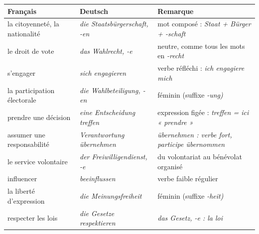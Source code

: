 \documentclass[11pt]{article}
\newcommand{\all}[1]{\ifmmode\text{\textit{#1}}\else\begingroup\selectlanguage{ngerman}\itshape #1\endgroup\fi}
\begin{document}
\begin{center}
\begin{tabularx}{\linewidth}{|X|X|X|}
\hline
\rowcolor{popblueL} \textbf{Français} & \textbf{Deutsch} & \textbf{Remarque} \\
\hline
la citoyenneté, la nationalité & \all{die Staatsbürgerschaft, -en} & mot composé : \all{Staat} + \all{Bürger} + \all{-schaft} \\
\hline
le droit de vote & \all{das Wahlrecht, -e} & neutre, comme tous les mots en \all{-recht} \\
\hline
s'engager & \all{sich engagieren} & verbe réfléchi : \all{ich engagiere mich} \\
\hline
la participation électorale & \all{die Wahlbeteiligung, -en} & féminin (suffixe \all{-ung}) \\
\hline
prendre une décision & \all{eine Entscheidung treffen} & expression figée : \all{treffen} = ici « prendre » \\
\hline
assumer une responsabilité & \all{Verantwortung übernehmen} & \all{übernehmen} : verbe fort, participe \all{übernommen} \\
\hline
le service volontaire & \all{der Freiwilligendienst, -e} & du volontariat au bénévolat organisé \\
\hline
influencer & \all{beeinflussen} & verbe faible régulier \\
\hline
la liberté d'expression & \all{die Meinungsfreiheit} & féminin (suffixe \all{-heit}) \\
\hline
respecter les lois & \all{die Gesetze respektieren} & \all{das Gesetz, -e} : la loi \\
\hline
\end{tabularx}
\end{center}
\end{document}
